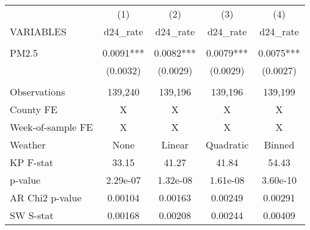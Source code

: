 \begin{tabular}{lcccc} \hline
 & (1) & (2) & (3) & (4) \\
VARIABLES & d24\_rate & d24\_rate & d24\_rate & d24\_rate \\ \hline
 &  &  &  &  \\
PM2.5 & 0.0091*** & 0.0082*** & 0.0079*** & 0.0075*** \\
 & (0.0032) & (0.0029) & (0.0029) & (0.0027) \\
 &  &  &  &  \\
Observations & 139,240 & 139,196 & 139,196 & 139,199 \\
County FE & X & X & X & X \\
Week-of-sample FE & X & X & X & X \\
Weather & None & Linear & Quadratic & Binned \\
KP F-stat & 33.15 & 41.27 & 41.84 & 54.43 \\
p-value & 2.29e-07 & 1.32e-08 & 1.61e-08 & 3.60e-10 \\
AR Chi2 p-value & 0.00104 & 0.00163 & 0.00249 & 0.00291 \\
 SW S-stat & 0.00168 & 0.00208 & 0.00244 & 0.00409 \\ \hline
\end{tabular}
